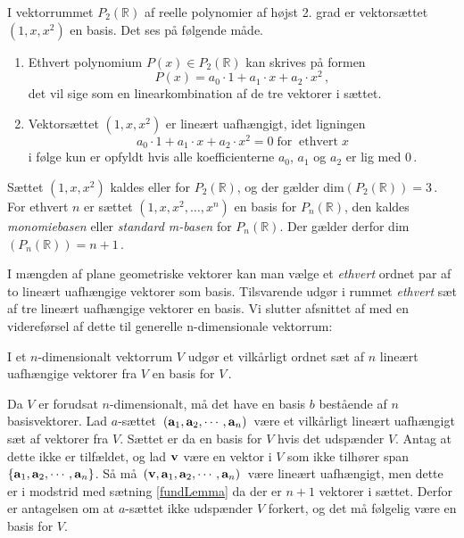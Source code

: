 \begin{example}
I vektorrummet $P_2(\mathbb R)$ af reelle polynomier af højst 2. grad er vektorsættet $(1,x,x^2)$ en basis. Det ses på følgende måde.
\begin{enumerate}
\item
Ethvert polynomium $P(x)\in P_2(\mathbb R)$ kan skrives på formen
$$P(x)=a_0\cdot 1+a_1\cdot x+a_2\cdot x^2\,,$$
det vil sige som en linearkombination af de tre vektorer i sættet.
\item
Vektorsættet $(1,x,x^2)$ er lineært uafhængigt, idet ligningen
$$
a_0\cdot 1+a_1\cdot x+a_2\cdot x^2=0\;\mathrm{for}\;\;\mathrm{ethvert}\;x
$$
i følge  kun er opfyldt hvis alle koefficienterne $a_0$, $a_1$ og $a_2$ er lig med $0$\,.
\end{enumerate}
Sættet $(1,x,x^2)$ kaldes  eller  for $P_2(\mathbb R)$, og der gælder dim$(P_2(\mathbb R))=3\,$.
\bs
For ethvert $n$ er sættet $(1,x,x^2,\ldots,x^n)$ en basis for $P_n(\mathbb R)$, den kaldes \textit{monomiebasen} eller \textit{standard m-basen} for $P_n(\mathbb R)$. Der gælder derfor dim$(P_n(\mathbb R))=n+1\,$.
\end{example}

I mængden af plane geometriske vektorer kan man vælge et \textit{ethvert} ordnet par af to lineært uafhængige vektorer som  basis. Tilsvarende udgør i rummet \textit{ethvert} sæt af tre lineært uafhængige vektorer en basis. Vi slutter afsnittet af med en videreførsel af dette til generelle n-dimensionale vektorrum:

\begin{theorem}\label{tn7.antalBasisvektorer2}
I et $n$-dimensionalt vektorrum $V$ udgør et vilkårligt ordnet sæt af $n$ lineært uafhængige vektorer fra $V$ en basis for $V\,$.
\end{theorem}
\begin{bevis}
Da $V$ er forudsat $n$-dimensionalt, må det have en basis $b$ bestående af $n$ basisvektorer. Lad $a$-sættet $\,(\mathbf{a}_1,\mathbf{a}_2,\cdots,\mathbf{a}_n)\,$ være et vilkårligt lineært uafhængigt sæt af vektorer fra $V$. Sættet er da en basis for $V$ hvis det udspænder $V$. Antag at dette ikke er tilfældet, og lad $\mathbf{v}$ være en vektor i $V$ som ikke tilhører span$\{\mathbf{a}_1,\mathbf{a}_2,\cdots,\mathbf{a}_n\}$. Så må   $\,(\mathbf{v},\mathbf{a}_1,\mathbf{a}_2,\cdots,\mathbf{a}_n)\,$ være lineært uafhængigt, men dette er i modstrid med sætning \ref{fundLemma} da der er $n+1$ vektorer i sættet. Derfor er antagelsen om at $a$-sættet ikke udspænder $V$ forkert, og det må følgelig være en basis for $V$. 
\end{bevis}

